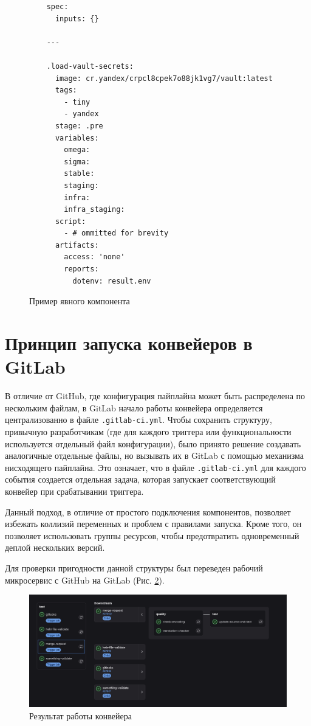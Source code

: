 \begin{figure}
  \centering
  \scriptsize
  \begin{verbatim}
    spec:
      inputs: {}

    ---

    .load-vault-secrets:
      image: cr.yandex/crpcl8cpek7o88jk1vg7/vault:latest
      tags:
        - tiny
        - yandex
      stage: .pre
      variables:
        omega:
        sigma:
        stable:
        staging:
        infra:
        infra_staging:
      script:
        - # ommitted for brevity
      artifacts:
        access: 'none'
        reports:
          dotenv: result.env
  \end{verbatim}
  \caption{Пример явного компонента}
  \label{fig:explicit-component-code}
\end{figure}

\section{Принцип запуска конвейеров в GitLab} \label{sec:pipeline-run-principal}
В отличие от GitHub, где конфигурация пайплайна может быть распределена по нескольким файлам,
в GitLab начало работы конвейера определяется централизованно в файле \texttt{.gitlab-ci.yml}.
Чтобы сохранить структуру, привычную разработчикам (где для каждого триггера или функциональности используется отдельный файл конфигурации),
было принято решение создавать аналогичные отдельные файлы,
но вызывать их в GitLab с помощью механизма нисходящего пайплайна.
Это означает, что в файле \texttt{.gitlab-ci.yml} для каждого события создается отдельная задача,
которая запускает соответствующий конвейер при срабатывании триггера.

Данный подход, в отличие от простого подключения компонентов, позволяет избежать коллизий переменных и проблем с правилами запуска.
Кроме того, он позволяет использовать группы ресурсов, чтобы предотвратить одновременный деплой нескольких версий.

Для проверки пригодности данной структуры был переведен рабочий микросервис с GitHub на GitLab (Рис. \ref{fig:pipeline-run-result}).

\begin{figure}[H]
  \centering
  \includegraphics[width=16cm]{img/pipeline-run-result}
  \caption{Результат работы конвейера}
  \label{fig:pipeline-run-result}
\end{figure}

